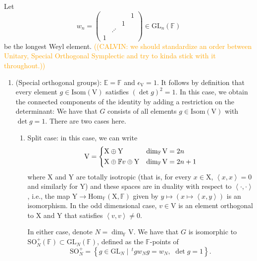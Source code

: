 \documentclass[12pt, reqno]{amsart}
\theoremstyle{definition}
\theoremstyle{definition}
\theoremstyle{definition}
\newcommand{\Hom}{\mathrm{Hom}}
\newcommand{\hermitianSpace}{\mathrm{V}}
\newcommand{\xIsotropic}{\mathrm{X}}
\newcommand{\yIsotropic}{\mathrm{Y}}
\newcommand{\innerproduct}[2]{\left\langle #1,#2\right\rangle}
\newcommand{\transpose}[1]{\, {}^{t}#1}
\newcommand{\GL}{\mathrm{GL}}
\newcommand{\SO}{\mathrm{SO}}
\newcommand{\finiteField}{\mathbb{F}}
\newcommand{\quadraticExtension}{\mathbb{E}}
\newcommand{\IsometryGroup}{\mathrm{Isom}}
\newcommand{\algebraicGroup}[1]{\boldsymbol{\mathrm{#1}}}
\newcommand{\calvin}[1]{\textcolor{orange}{\sffamily ((CALVIN: #1))}}
\begin{document}
Let $$w_n = \begin{pmatrix}
	& & & 1\\
	& & 1\\
	& \iddots\\
	1
\end{pmatrix} \in \GL_n\left(\finiteField\right)$$ be the longest Weyl element.
\calvin{we should standardize an order between Unitary, Special Orthogonal Symplectic and try to kinda stick with it throughout.}
\begin{enumerate}
	\item (Special orthogonal groups): $\quadraticExtension = \finiteField$ and $\epsilon_{\hermitianSpace} = 1$. It follows by definition that every element $g \in \IsometryGroup\left(\hermitianSpace\right)$ satisfies $\left(\det g\right)^2 = 1$.  In this case, we obtain the connected components of the identity by adding a restriction on the determinant: We have that $G$ consists of all elements $g \in \IsometryGroup\left(\hermitianSpace\right)$ with $\det g = 1$. There are two cases here.
	\begin{enumerate}
		\item Split case: in this case, we can write $$\hermitianSpace = \begin{dcases}
		\xIsotropic \oplus \yIsotropic & \dim_{\finiteField} \hermitianSpace = 2n\\
		\xIsotropic \oplus \finiteField v \oplus \yIsotropic & \dim_{\finiteField}\hermitianSpace = 2n + 1
		\end{dcases}$$ where $\xIsotropic$ and $\yIsotropic$ are totally isotropic (that is, for every $x \in \xIsotropic$, $\innerproduct{x}{x} = 0$ and similarly for $\yIsotropic$) and these spaces are in duality with respect to $\innerproduct{\cdot}{\cdot}$, i.e., the map $\yIsotropic \to \Hom_{\finiteField}\left(\xIsotropic, \finiteField\right)$ given by $y \mapsto \left(x \mapsto \innerproduct{x}{y}\right)$ is an isomorphism. In the odd dimensional case, $v \in \hermitianSpace$ is an element orthogonal to $\xIsotropic$ and $\yIsotropic$ that satisfies $\innerproduct{v}{v} \ne 0$.
		
		In either case, denote $N = \dim_{\finiteField} \hermitianSpace$. We have that $G$ is isomorphic to $\SO^{+}_{N}\left(\finiteField\right) \subset  \GL_{N}\left(\finiteField\right)$, defined as the $\finiteField$-points of $$\algebraicGroup{\SO}^{+}_{N} = \left\{g \in \algebraicGroup{\GL}_{N} \mid \transpose{g} w_{N} g  = w_{N},\,\, \det g = 1\right\}.$$
		

\end{enumerate}
\end{enumerate}
\end{document}
